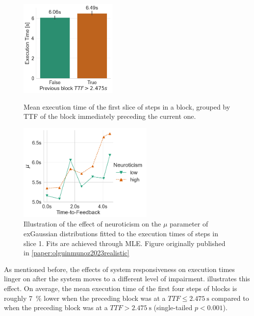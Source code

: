 \begin{figure}
    \begin{minipage}[t]{.45\textwidth}
        \centering
        \includegraphics[height=13em]{Figs/2021Impact/previousblock_vs_exectime}
        \caption{Mean execution time of the first slice of steps in a block, grouped by \acs{TTF} of the block immediately preceding the current one.}\label{fig:prevblockvsexectime}
    \end{minipage}%
    \hfill%
    \begin{minipage}[t]{.45\textwidth}
        \centering
        \includegraphics[height=13em]{publications/2023EdgeDroid2/figs/new_model/mu_fits_exgaussian_slice0}
        \caption{%
            Illustration of the effect of neuroticism on the \ensuremath{\mu} parameter of \acs{exGaussian} distributions fitted to the execution times of steps in slice \num{1}.
            Fits are achieved through \gls{MLE}.
            Figure originally published in \cref{paper:olguinmunoz2023realistic}
        }\label{fig:ttfvsexgaussianmu}
    \end{minipage}
\end{figure}

As mentioned before, the effects of system responsiveness on execution times linger on after the system moves to a different level of impairment.
 illustrates this effect.
On average, the mean execution time of the first four steps of blocks is roughly \SI{7}{\percent} lower when the preceding block was at a \ensuremath{TTF \leq \SI{2.475}{\second}} compared to when the preceding block was at a \ensuremath{TTF > \SI{2.475}{\second}} (single-tailed \ensuremath{p < 0.001}).


